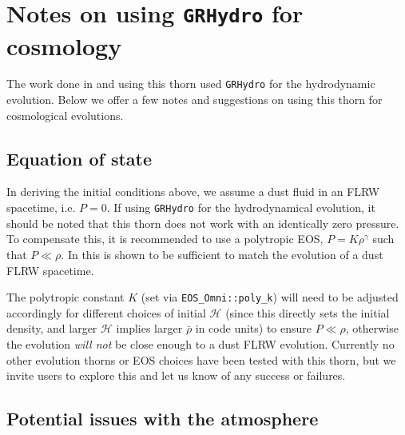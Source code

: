 \section{Notes on using {\tt GRHydro} for cosmology}
\label{EinsteinInitialData_flrwsolver_sec:note}

The work done in \cite{EinsteinInitialData_flrwsolver_macpherson2017} and \cite{EinsteinInitialData_flrwsolver_macpherson2019} using this thorn used {\tt GRHydro} for the hydrodynamic evolution. Below we offer a few notes and suggestions on using this thorn for cosmological evolutions. 

\subsection{Equation of state}

In deriving the initial conditions above, we assume a dust fluid in an FLRW spacetime, i.e. $P=0$. If using {\tt GRHydro} for the hydrodynamical evolution, it should be noted that this thorn does not work with an identically zero pressure. To compensate this, it is recommended to use a polytropic EOS, $P=K \rho^{\gamma}$ such that $P\ll\rho$. In \cite{EinsteinInitialData_flrwsolver_macpherson2017} this is shown to be sufficient to match the evolution of a dust FLRW spacetime. 

The polytropic constant $K$ (set via \texttt{EOS\_Omni::poly\_k}) will need to be adjusted accordingly for different choices of initial $\mathcal{H}$ (since this directly sets the initial density, and larger $\mathcal{H}$ implies larger $\bar{\rho}$ in code units) to ensure $P\ll\rho$, otherwise the evolution \textit{will not} be close enough to a dust FLRW evolution. Currently no other evolution thorns or EOS choices have been tested with this thorn, but we invite users to explore this and let us know of any success or failures.



\subsection{Potential issues with the atmosphere}

